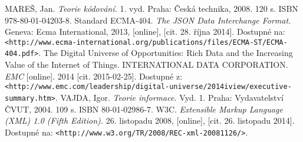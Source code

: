 \begin{thebibliography}{99}
 MAREŠ, Jan. {\em Teorie kódování.} 1. vyd. Praha: Česká technika, 2008. 120 s. ISBN 978-80-01-04203-8.
 Standard ECMA-404. {\em The JSON Data Interchange Format.} Geneva: Ecma International, 2013, [online], [cit. 28. října 2014]. Dostupné na: {\tt <http://www.ecma-international.org/publications/files/ECMA-ST/ECMA-404.pdf>}.
 The Digital Universe of Opportunities: Rich Data and the Increasing Value of the Internet of Things. INTERNATIONAL DATA CORPORATION. {\em EMC} [online]. 2014 [cit. 2015-02-25]. Dostupné z: {\tt <http://www.emc.com/leadership/digital-universe/2014iview/executive-summary.htm>}.
 VAJDA, Igor. {\em Teorie informace.} Vyd. 1. Praha: Vydavatelství ČVUT, 2004. 109 s. ISBN 80-01-02986-7.
 W3C. {\em Extensible Markup Language (XML) 1.0 (Fifth Edition).} 26. listopadu 2008, [online], [cit. 26. listopadu 2014]. Dostupné na: {\tt <http://www.w3.org/TR/2008/REC-xml-20081126/>}.
\end{thebibliography}
